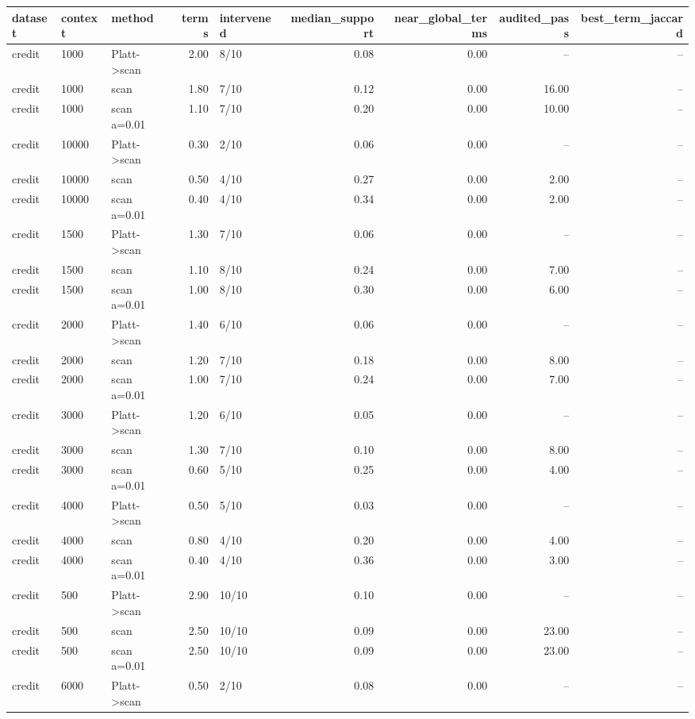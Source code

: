 \begin{tabular}{lllrlrrrr}
\toprule
dataset & context & method & terms & intervened & median_support & near_global_terms & audited_pass & best_term_jaccard \\
\midrule
credit & 1000 & Platt->scan & 2.00 & 8/10 & 0.08 & 0.00 & -- & -- \\
credit & 1000 & scan & 1.80 & 7/10 & 0.12 & 0.00 & 16.00 & -- \\
credit & 1000 & scan a=0.01 & 1.10 & 7/10 & 0.20 & 0.00 & 10.00 & -- \\
credit & 10000 & Platt->scan & 0.30 & 2/10 & 0.06 & 0.00 & -- & -- \\
credit & 10000 & scan & 0.50 & 4/10 & 0.27 & 0.00 & 2.00 & -- \\
credit & 10000 & scan a=0.01 & 0.40 & 4/10 & 0.34 & 0.00 & 2.00 & -- \\
credit & 1500 & Platt->scan & 1.30 & 7/10 & 0.06 & 0.00 & -- & -- \\
credit & 1500 & scan & 1.10 & 8/10 & 0.24 & 0.00 & 7.00 & -- \\
credit & 1500 & scan a=0.01 & 1.00 & 8/10 & 0.30 & 0.00 & 6.00 & -- \\
credit & 2000 & Platt->scan & 1.40 & 6/10 & 0.06 & 0.00 & -- & -- \\
credit & 2000 & scan & 1.20 & 7/10 & 0.18 & 0.00 & 8.00 & -- \\
credit & 2000 & scan a=0.01 & 1.00 & 7/10 & 0.24 & 0.00 & 7.00 & -- \\
credit & 3000 & Platt->scan & 1.20 & 6/10 & 0.05 & 0.00 & -- & -- \\
credit & 3000 & scan & 1.30 & 7/10 & 0.10 & 0.00 & 8.00 & -- \\
credit & 3000 & scan a=0.01 & 0.60 & 5/10 & 0.25 & 0.00 & 4.00 & -- \\
credit & 4000 & Platt->scan & 0.50 & 5/10 & 0.03 & 0.00 & -- & -- \\
credit & 4000 & scan & 0.80 & 4/10 & 0.20 & 0.00 & 4.00 & -- \\
credit & 4000 & scan a=0.01 & 0.40 & 4/10 & 0.36 & 0.00 & 3.00 & -- \\
credit & 500 & Platt->scan & 2.90 & 10/10 & 0.10 & 0.00 & -- & -- \\
credit & 500 & scan & 2.50 & 10/10 & 0.09 & 0.00 & 23.00 & -- \\
credit & 500 & scan a=0.01 & 2.50 & 10/10 & 0.09 & 0.00 & 23.00 & -- \\
credit & 6000 & Platt->scan & 0.50 & 2/10 & 0.08 & 0.00 & -- & -- \\

\end{tabular}
